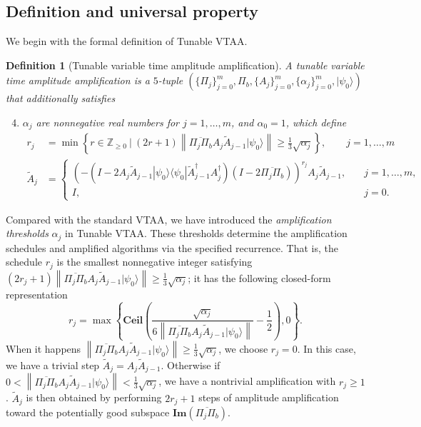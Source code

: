 \documentclass[letterpaper,onecolumn,11pt,accepted=2026-02-14]{quantumarticle}
\newcommand{\norm}[1]{\left\lVert#1\right\rVert}
\newtheorem{definition}[lemma]{Definition}
\theoremstyle{remark}
\theoremstyle{plain}
\newcommand{\ket}[1]{|#1\rangle}
\newcommand{\bra}[1]{\langle#1|}
\newcommand{\ketbra}[2]{\ket{#1}\!\bra{#2}}
\begin{document}
\subsection{Definition and universal property}
\label{sec:tunable_universal}
We begin with the formal definition of Tunable VTAA.
\begin{definition}[Tunable variable time amplitude amplification]
\label{defn:tunable}
A tunable variable time amplitude amplification is a $5$-tuple $\left(\{\Pi_j\}_{j=0}^m,\Pi_b,\{A_j\}_{j=0}^m,\{\alpha_j\}_{j=0}^m,\ket{\psi_0}\right)$ that additionally satisfies
\begin{enumerate}[label=(\roman*$''$)]
\setcounter{enumi}{3}
    \item \label{enum:tunable_amp} $\alpha_j$ are nonnegative real numbers for $j=1,\ldots,m$, and $\alpha_0=1$, which define
\begin{equation}
\begin{aligned}
    r_j&=\min\left\{r\in\mathbb Z_{\geq0}\ \big|\ (2r+1)\norm{\overline{\Pi_j\Pi_b}A_j\widetilde A_{j-1}\ket{\psi_0}}\geq\frac{1}{3}\sqrt{\alpha_j}\right\},\qquad j=1,\ldots,m\\
    \widetilde A_j
    &=
    \begin{cases}
        \left(-\left(I-2A_j\widetilde A_{j-1}\ketbra{\psi_0}{\psi_0}\widetilde A_{j-1}^\dagger A_j^\dagger\right)\left(I-2\overline{\Pi_j\Pi_b}\right)\right)^{r_j}A_j\widetilde A_{j-1},\quad&j=1,\ldots,m,\\
        I,&j=0.
    \end{cases}
\end{aligned}
\end{equation}
\end{enumerate}
\end{definition}
Compared with the standard VTAA, we have introduced the \emph{amplification thresholds} $\alpha_j$ in Tunable VTAA. These thresholds determine the amplification schedules and amplified algorithms via the specified recurrence. That is, the schedule $r_j$ is the smallest nonnegative integer satisfying $(2r_j+1)\norm{\overline{\Pi_j\Pi_b}A_j\widetilde A_{j-1}\ket{\psi_0}}\geq\frac{1}{3}\sqrt{\alpha_j}$; it has the following closed-form representation
    \begin{equation}
        r_j=\max\left\{\mathbf{Ceil}\left(\frac{\sqrt{\alpha_j}}{6\norm{\overline{\Pi_j\Pi_b}A_j\widetilde A_{j-1}\ket{\psi_0}}}-\frac{1}{2}\right),0\right\}.
    \end{equation}
When it happens $\norm{\overline{\Pi_j\Pi_b}A_j\widetilde A_{j-1}\ket{\psi_0}}\geq\frac{1}{3}\sqrt{\alpha_j}$, we choose $r_j=0$. In this case, we have a trivial step $\widetilde A_j=A_j\widetilde A_{j-1}$. Otherwise if $0<\norm{\overline{\Pi_j\Pi_b}A_j\widetilde A_{j-1}\ket{\psi_0}}<\frac{1}{3}\sqrt{\alpha_j}$, we have a nontrivial amplification with $r_j\geq1$. $\widetilde A_j$ is then obtained by performing $2r_j+1$ steps of amplitude amplification toward the potentially good subspace $\mathbf{Im}\left(\overline{\Pi_j\Pi_b}\right)$.
\end{document}
